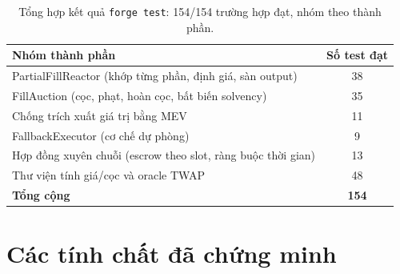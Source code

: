 \documentclass[../DoAn.tex]{subfiles}
\begin{document}
\begin{table}[H]
    \centering
    \caption{Tổng hợp kết quả \texttt{forge test}: 154/154 trường hợp đạt, nhóm theo thành phần.}
    \label{table:forge}
    \begin{tabular}{|p{8.5cm}|c|}
        \hline
        \textbf{Nhóm thành phần} & \textbf{Số test đạt} \\
        \hline
        PartialFillReactor (khớp từng phần, định giá, sàn output) & 38 \\
        \hline
        FillAuction (cọc, phạt, hoàn cọc, bất biến solvency) & 35 \\
        \hline
        Chống trích xuất giá trị bằng MEV & 11 \\
        \hline
        FallbackExecutor (cơ chế dự phòng) & 9 \\
        \hline
        Hợp đồng xuyên chuỗi (escrow theo slot, ràng buộc thời gian) & 13 \\
        \hline
        Thư viện tính giá/cọc và oracle TWAP & 48 \\
        \hline
        \textbf{Tổng cộng} & \textbf{154} \\
        \hline
    \end{tabular}
\end{table}

\section{Các tính chất đã chứng minh}
\label{sec:test-proof}
\end{document}
